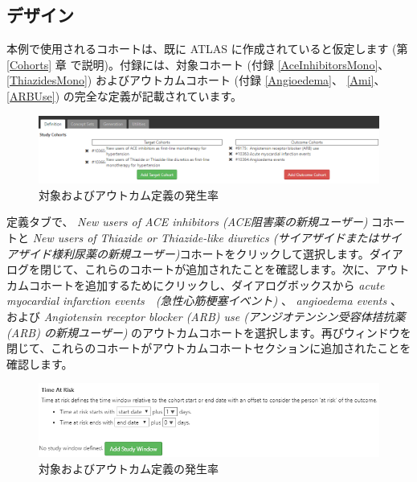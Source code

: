 \documentclass[
  11pt]{book}
\theoremstyle{definition}
\theoremstyle{definition}
\theoremstyle{definition}
\theoremstyle{definition}
\theoremstyle{remark}
\begin{document}
\subsection{デザイン}\label{ux30c7ux30b6ux30a4ux30f3-2}

本例で使用されるコホートは、既に ATLAS に作成されていると仮定します (第 \ref{Cohorts} 章 で説明)。付録には、対象コホート (付録 \ref{AceInhibitorsMono}、\ref{ThiazidesMono}) およびアウトカムコホート (付録 \ref{Angioedema}、 \ref{Ami}、 \ref{ARBUse}) の完全な定義が記載されています。

\begin{figure}

{\centering \includegraphics[width=1\linewidth]{images/Characterization/atlasIncidenceCohortSelection} 

}

\caption{対象およびアウトカム定義の発生率}\label{fig:atlasIncidenceCohortSelection}
\end{figure}

定義タブで、 \emph{New users of ACE inhibitors (ACE阻害薬の新規ユーザー)} コホートと \emph{New users of Thiazide or Thiazide-like diuretics (サイアザイドまたはサイアザイド様利尿薬の新規ユーザー)}コホートをクリックして選択します。ダイアログを閉じて、これらのコホートが追加されたことを確認します。次に、アウトカムコホートを追加するためにクリックし、ダイアログボックスから \emph{acute myocardial infarction events　(急性心筋梗塞イベント)} 、 \emph{angioedema events} 、および \emph{Angiotensin receptor blocker (ARB) use (アンジオテンシン受容体拮抗薬 (ARB) の新規ユーザー)} のアウトカムコホートを選択します。再びウィンドウを閉じて、これらのコホートがアウトカムコホートセクションに追加されたことを確認します。

\begin{figure}

{\centering \includegraphics[width=1\linewidth]{images/Characterization/atlasIncidenceTimeAtRisk} 

}

\caption{対象およびアウトカム定義の発生率}\label{fig:atlasIncidenceTimeAtRisk}
\end{figure}
\end{document}
